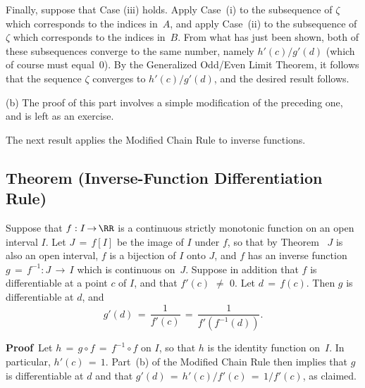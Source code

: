         Finally, suppose that Case (iii) holds. Apply Case~(i) to the subsequence of ${\zeta}$ which corresponds to the indices in~$A$,
    and apply Case~(ii) to the subsequence of ${\zeta}$ which corresponds to the indices in~$B$.
    From what has just been shown, both of these subsequences converge to the same number, namely $h'(c)/g'(d)$ (which of course must equal~$0$).
    By the Generalized Odd/Even Limit Theorem, it follows that the sequence ${\zeta}$ converges to $h'(c)/g'(d)$, and the desired result follows.

\V

        (b) The proof of this part involves a simple modification of the preceding one, and is left as an exercise.

\VV

        The next result applies the Modified Chain Rule to inverse functions.

\V


            \subsection{\small{\bf Theorem} (Inverse-Function Differentiation Rule)}
            \label{ThmE30.77}

\V

        Suppose that $f:I \,{\rightarrow}\, {\RR}$ is a continuous strictly monotonic function on an open interval $I$.
    Let $J \,=\, f[I]$ be the image of $I$ under $f$, so that by Theorem~ $J$ is also an open interval,
    $f$ is a bijection of $I$ onto $J$, and $f$ has an inverse function $g \,=\, f^{-1}:J \,{\rightarrow}\, I$ which is continuous on~$J$.
    Suppose in addition that $f$ is differentiable at a point $c$ of $I$, and that $f'(c) \,\,{\neq}\,\, 0$. Let $d \,=\, f(c)$.
    Then $g$ is differentiable at $d$, and
        \begin{equation}
        \label{EqnE.70}
        g'(d) \,=\, \frac{1}{f'(c)} \,=\, \frac{1}{f'(f^{-1}(d))}.
        \end{equation}

\V

        {\bf Proof}\, Let $h \,=\, g{\circ}f \,=\, f^{-1}{\circ}f$ on $I$, so that $h$ is the identity function on~$I$.
    In particular, $h'(c) \,=\, 1$. Part~(b) of the Modified Chain Rule then implies that $g$ is differentiable at $d$ and that $g'(d) \,=\, h'(c)/f'(c) \,=\, 1/f'(c)$, as claimed. \Q

